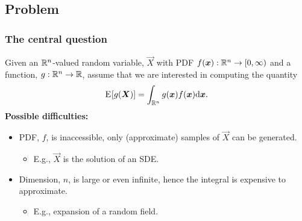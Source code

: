 \subsection{Problem}
\begin{frame}\frametitle{The central question}
  Given an $\mathbb{R}^n$-valued random variable, $\vec X$ with PDF
  $f({{\boldsymbol x}}) : \mathbb{R}^n \to [0,\infty)$ and a function,
  $g : \mathbb{R}^n \to \mathbb{R}$, assume that we are interested in
  computing the quantity
\begin{equation*}\label{eq:expectation}
  {\ensuremath{\mathrm{E}}\mspace{-2mu}\left[g({\ensuremath{{\boldsymbol X}}})\right]} = \int_{\mathbb{R}^n} g({{\boldsymbol x}}) f({{\boldsymbol x}}) { \mathrm{d} }{{{\boldsymbol x}}}.
\end{equation*}
\pause
\vskip 0.5cm \textbf{Possible difficulties:}
\begin{itemize}
\item PDF, $f$, is inaccessible, only (approximate) samples of $\vec X$ can be generated.
\begin{itemize}
\item E.g., $\vec X$ is the solution of an SDE.
\end{itemize}
\item Dimension, $n$, is large or even infinite, hence the integral is expensive to approximate.
\begin{itemize}
\item E.g., expansion of a random field.
\end{itemize}
\end{itemize}
\end{frame}

